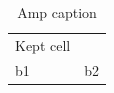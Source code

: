 \documentclass{article}
\begin{document}
\begin{longtable}{ll}
Kept cell & \caption{Amp caption}\\
b1 & b2\\
\end{longtable}
\end{document}
